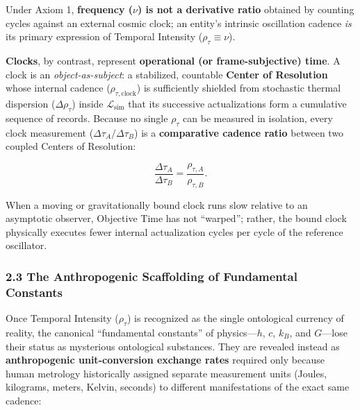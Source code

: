 \documentclass[
]{article}
\begin{document}
Under Axiom 1, \textbf{frequency (\(\nu\)) is not a derivative ratio}
obtained by counting cycles against an external cosmic clock; an
entity's intrinsic oscillation cadence \emph{is} its primary expression
of Temporal Intensity (\(\rho_\tau \equiv \nu\)).

\textbf{Clocks}, by contrast, represent \textbf{operational (or
frame-subjective) time}. A clock is an \emph{object-as-subject}: a
stabilized, countable \textbf{Center of Resolution} whose internal
cadence (\(\rho_{\tau,\text{clock}}\)) is sufficiently shielded from
stochastic thermal dispersion (\(\Delta\rho_\tau\)) inside
\(\mathcal{L}_{\text{sim}}\) that its successive actualizations form a
cumulative sequence of records. Because no single \(\rho_\tau\) can be
measured in isolation, every clock measurement
(\(\Delta\tau_A / \Delta\tau_B\)) is a \textbf{comparative cadence
ratio} between two coupled Centers of Resolution:

\[\frac{\Delta \tau_A}{\Delta \tau_B} = \frac{\rho_{\tau,A}}{\rho_{\tau,B}}.\]

When a moving or gravitationally bound clock runs slow relative to an
asymptotic observer, Objective Time has not ``warped''; rather, the
bound clock physically executes fewer internal actualization cycles per
cycle of the reference oscillator.

\subsubsection{2.3 The Anthropogenic Scaffolding of Fundamental
Constants}\label{the-anthropogenic-scaffolding-of-fundamental-constants}

Once Temporal Intensity (\(\rho_\tau\)) is recognized as the single
ontological currency of reality, the canonical ``fundamental constants''
of physics---\(h\), \(c\), \(k_B\), and \(G\)---lose their status as
mysterious ontological substances. They are revealed instead as
\textbf{anthropogenic unit-conversion exchange rates} required only
because human metrology historically assigned separate measurement units
(Joules, kilograms, meters, Kelvin, seconds) to different manifestations
of the exact same cadence:
\end{document}

